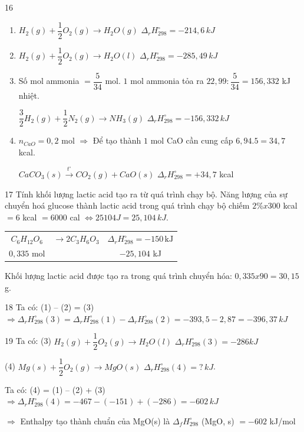 \def\writeANS{}
\begin{loigiaibth}{16}
  \begin {enumerate} \item [(a)] $H_2(g) + \dfrac {1}{2}O_2(g) \longrightarrow H_2O(g)\,\, \Delta _r H_{298}^\circ = -214{,}6\, kJ$ \item [(b)] $H_2(g) + \dfrac {1}{2}O_2(g) \longrightarrow H_2O(l)\,\, \Delta _r H_{298}^\circ = -285{,}49\, kJ$ \item [(c)] Số mol ammonia $= \dfrac {5}{34}$ mol. $1$ mol ammonia tỏa ra $22{,}99 : \dfrac {5}{34} = 156{,}332$ kJ nhiệt. \par $\dfrac {3}{2}H_2(g) + \dfrac {1}{2}N_2(g) \longrightarrow NH_3(g)\,\, \Delta _r H_{298}^\circ = -156{,}332\, kJ$ \item [(d)] $n_{CaO} = 0{,}2$ mol $\Rightarrow $ Để tạo thành $1$ mol CaO cần cung cấp $6{,}94.5 = 34{,}7$ kcal. \par $CaCO_3(s) \xrightarrow {t^\circ } CO_2(g) + CaO(s)\,\, \Delta _r H_{298}^\circ = +34{,}7$ kcal \end {enumerate}
\end{loigiaibth}
\def\writeANS{}
\begin{loigiaibth}{17}
  Tính khối lượng lactic acid tạo ra từ quá trình chạy bộ. Năng lượng của sự chuyển hoá glucose thành lactic acid trong quá trình chạy bộ chiếm $2\% x 300$ kcal $= 6$ kcal $= 6 000$ cal $\Leftrightarrow 25 104 J = 25{,}104\, kJ$. \par \begin {tabular}{ccc} $C_6H_{12}O_6$ & $\longrightarrow 2C_3H_6O_3$ & $\Delta _r H_{298}^\circ = -150\, \text {kJ}$ \\ $0{,}335$ mol & & $-25{,}104$ kJ \end {tabular} \par Khối lượng lactic acid được tạo ra trong quá trình chuyển hóa: $0{,}335 x 90 = 30{,}15$ g.
\end{loigiaibth}
\def\writeANS{}
\begin{loigiaibth}{18}
  Ta có: (1) – (2) = (3) $\Rightarrow \Delta _r H_{298}^\circ (3) = \Delta _r H_{298}^\circ (1) - \Delta _r H_{298}^\circ (2) = -393{,}5 - 2{,}87 = -396{,}37\, kJ$
\end{loigiaibth}
\def\writeANS{}
\begin{loigiaibth}{19}
  Ta có: (3) $H_2(g) + \dfrac {1}{2}O_2(g) \longrightarrow H_2O(l)\,\, \Delta _r H_{298}^\circ (3) = -286kJ$ \par (4) $Mg(s) + \dfrac {1}{2}O_2(g) \longrightarrow MgO(s)\,\, \Delta _r H_{298}^\circ (4) = ?\, kJ$. \par Ta có: (4) = (1) – (2) + (3) $\Rightarrow \Delta _r H_{298}^\circ (4) = -467 - (-151) + (-286) = -602\, kJ$ \par $\Rightarrow $ Enthalpy tạo thành chuẩn của MgO(s) là $\Delta _f H_{298}^\circ $ (MgO, s) $= -602$ kJ/mol
\end{loigiaibth}
